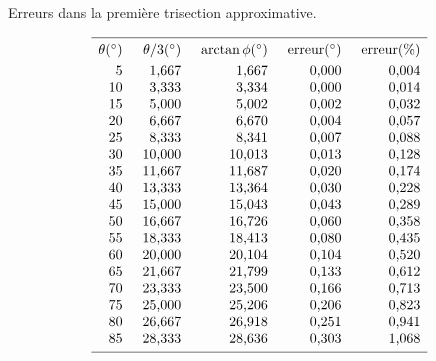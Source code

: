 \begin{table}[t]
\caption{Erreurs dans la première trisection approximative.}\label{t.trisect-first}
\[
%
\begin{array}{r@{\hspace{5mm}}r@{\hspace{5mm}}r@{\hspace{5mm}}r@{\hspace{5mm}}r}
\hline
\noalign{\smallskip}
\theta ({}^\circ) & \theta/3 ({}^\circ)& \arctan \phi ({}^\circ) & \mathrm{erreur} ({}^\circ) & \mathrm{erreur (\%)}\\
\noalign{\smallskip}
  5 &    \mbox{1,667} &    \mbox{1,667}  &     \mbox{0,000} &    \mbox{0,004} \\
 10 &    \mbox{3,333} &    \mbox{3,334}  &     \mbox{0,000} &    \mbox{0,014} \\
 15 &    \mbox{5,000} &    \mbox{5,002}  &     \mbox{0,002} &    \mbox{0,032} \\
 20 &    \mbox{6,667} &    \mbox{6,670}  &     \mbox{0,004} &    \mbox{0,057} \\
 25 &    \mbox{8,333} &    \mbox{8,341}  &     \mbox{0,007} &    \mbox{0,088} \\
 30 &   \mbox{10,000} &   \mbox{10,013}  &     \mbox{0,013} &    \mbox{0,128} \\
 35 &   \mbox{11,667} &   \mbox{11,687}  &     \mbox{0,020} &    \mbox{0,174} \\
 40 &   \mbox{13,333} &   \mbox{13,364}  &     \mbox{0,030} &    \mbox{0,228} \\
 45 &   \mbox{15,000} &   \mbox{15,043}  &     \mbox{0,043} &    \mbox{0,289} \\
 50 &   \mbox{16,667} &   \mbox{16,726}  &     \mbox{0,060} &    \mbox{0,358} \\
 55 &   \mbox{18,333} &   \mbox{18,413}  &     \mbox{0,080} &    \mbox{0,435} \\
 60 &   \mbox{20,000} &   \mbox{20,104}  &     \mbox{0,104} &    \mbox{0,520} \\
 65 &   \mbox{21,667} &   \mbox{21,799}  &     \mbox{0,133} &    \mbox{0,612} \\
 70 &   \mbox{23,333} &   \mbox{23,500}  &     \mbox{0,166} &    \mbox{0,713} \\
 75 &   \mbox{25,000} &   \mbox{25,206}  &     \mbox{0,206} &    \mbox{0,823} \\
 80 &   \mbox{26,667} &   \mbox{26,918}  &     \mbox{0,251} &    \mbox{0,941} \\
 85 &   \mbox{28,333} &   \mbox{28,636}  &     \mbox{0,303} &    \mbox{1,068} \\
 \noalign{\smallskip}
 \hline
 \end{array}
\]
\end{table}

